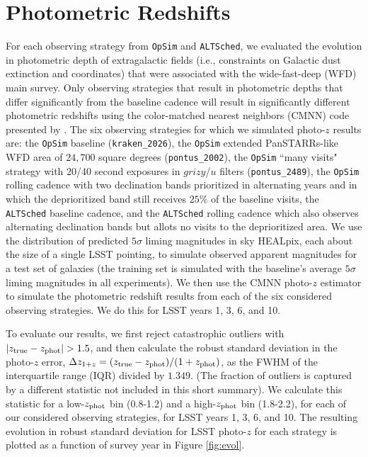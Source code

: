 \section{Photometric Redshifts}

For each observing strategy from {\tt OpSim} and {\tt ALTSched}, we evaluated the evolution in photometric depth of extragalactic fields (i.e., constraints on Galactic dust extinction and coordinates) that were associated with the wide-fast-deep (WFD) main survey. Only observing strategies that result in photometric depths that differ significantly from the baseline cadence will result in significantly different photometric redshifts using the color-matched nearest neighbors (CMNN) code presented by \cite{2018AJ....155....1G}. The six observing strategies for which we simulated photo-$z$ results are: the {\tt OpSim} baseline ({\tt kraken\_2026}), the {\tt OpSim} extended PanSTARRs-like WFD area of $24,700$ square degrees ({\tt pontus\_2002}), the {\tt OpSim}  ``many visits" strategy with 20/40 second exposures in $grizy$/$u$ filters ({\tt pontus\_2489}), the {\tt OpSim} rolling cadence with two declination bands prioritized in alternating years and in which the deprioritized band still receives $25\%$ of the baseline visits, the {\tt ALTSched} baseline cadence, and the {\tt ALTSched} rolling cadence which also observes alternating declination bands but allots no visits to the deprioritized area. We use the distribution of predicted $5{\sigma}$ liming magnitudes in sky HEALpix, each about the size of a single LSST pointing, to simulate observed apparent magnitudes for a test set of galaxies (the training set is simulated with the baseline's average $5{\sigma}$ liming magnitudes in all experiments). We then use the CMNN photo-$z$ estimator to simulate the photometric redshift results from each of the six considered observing strategies. We do this for LSST years 1, 3, 6, and 10.

To evaluate our results, we first reject catastrophic outliers with $|z_{\rm true}-z_{\rm phot}|>1.5$, and then 
calculate the robust standard deviation in the photo-$z$ error, $\Delta z _{1+z} = (z_{\rm true}-z_{\rm phot})/(1+z_{\rm 
phot})$, as the FWHM of the interquartile range (IQR) divided by $1.349$. (The fraction of outliers is captured by a 
different statistic not included in this short summary). We calculate this statistic for a low-$z_{\rm phot}$ bin 
(0.8-1.2) and a high-$z_{\rm phot}$ bin (1.8-2.2), for each of our considered observing strategies, for LSST years 1, 3, 
6, and 10. The resulting evolution in robust standard deviation for LSST photo-$z$ for each strategy is plotted as a 
function of survey year in Figure \ref{fig:evol}.


